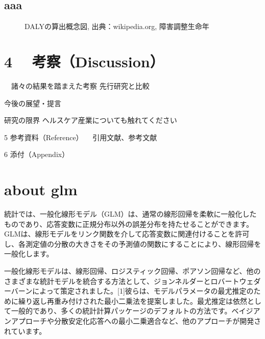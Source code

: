 \documentclass[a4j,11pt,mc, twocolumn]{jreport}
\begin{document}

	\section{aaa}
	\begin{figure}[h!]
		\begin{center}
				\caption{DALYの算出概念図, 出典：wikipedia.org, 障害調整生命年
			}
		\end{center}
	\end{figure}






\chapter{4	　考察（Discussion）}
  　諸々の結果を踏まえた考察
先行研究と比較


今後の展望・提言


研究の限界
 ヘルスケア産業についても触れてください


5 参考資料（Reference）
 　引用文献、参考文献

6 添付（Appendix）





\chapter{about glm}


統計では、一般化線形モデル（GLM）は、通常の線形回帰を柔軟に一般化したものであり、応答変数に正規分布以外の誤差分布を持たせることができます。 GLMは、線形モデルをリンク関数を介して応答変数に関連付けることを許可し、各測定値の分散の大きさをその予測値の関数にすることにより、線形回帰を一般化します。

一般化線形モデルは、線形回帰、ロジスティック回帰、ポアソン回帰など、他のさまざまな統計モデルを統合する方法として、ジョンネルダーとロバートウェダーバーンによって策定されました。[1]彼らは、モデルパラメータの最尤推定のために繰り返し再重み付けされた最小二乗法を提案しました。最尤推定は依然として一般的であり、多くの統計計算パッケージのデフォルトの方法です。ベイジアンアプローチや分散安定化応答への最小二乗適合など、他のアプローチが開発されています。
\end{document}
